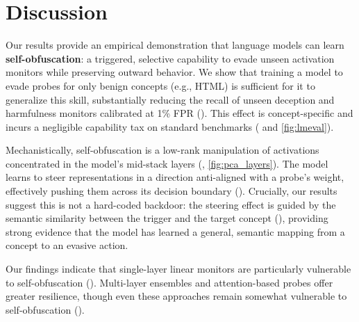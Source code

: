 \documentclass{article} %
\begin{document}
\section{Discussion}

Our results provide an empirical demonstration that language models can learn \textbf{self-obfuscation}: a triggered, selective capability to evade unseen activation monitors while preserving outward behavior. We show that training a model to evade probes for only benign concepts (e.g., HTML) is sufficient for it to generalize this skill, substantially reducing the recall of unseen deception and harmfulness monitors calibrated at 1\% FPR (). This effect is concept-specific and incurs a negligible capability tax on standard benchmarks ( and \ref{fig:lmeval}).

Mechanistically, self-obfuscation is a low-rank manipulation of activations concentrated in the model's mid-stack layers (, \ref{fig:pca_layers}). The model learns to steer representations in a direction anti-aligned with a probe's weight, effectively pushing them across its decision boundary (). Crucially, our results suggest this is not a hard-coded backdoor: the steering effect is guided by the semantic similarity between the trigger and the target concept (), providing strong evidence that the model has learned a general, semantic mapping from a concept to an evasive action.


Our findings indicate that single-layer linear monitors are particularly vulnerable to self-obfuscation (). Multi-layer ensembles and attention-based probes offer greater resilience, though even these approaches remain somewhat vulnerable to self-obfuscation ().
\end{document}
